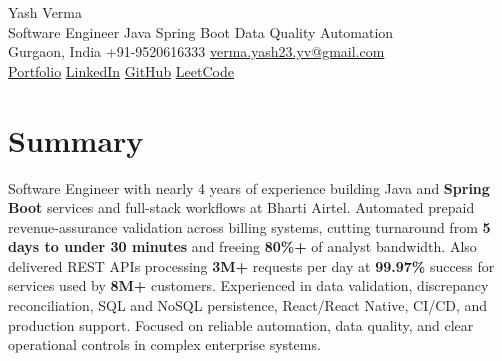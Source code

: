 \documentclass[letterpaper,11pt]{article}
\begin{document}
\begin{center}
  {\Huge Yash Verma} \\
  \small Software Engineer \textperiodcentered{} Java \textperiodcentered{} Spring Boot \textperiodcentered{} Data Quality \textperiodcentered{} Automation \\
  \vspace{5pt}
  \small Gurgaon, India \textbar{} +91-9520616333 \textbar{}
  \href{mailto:verma.yash23.yv@gmail.com}{verma.yash23.yv@gmail.com} \\
  \vspace{7pt}
  \href{https://yashverma230600.github.io/yash-portfolio/}{Portfolio} \textbar{}
  \href{https://www.linkedin.com/in/yash-verma-9243a7193/}{LinkedIn} \textbar{}
  \href{https://github.com/yashverma230600}{GitHub} \textbar{}
  \href{https://leetcode.com/yashverma230600}{LeetCode}
  \vspace{-8pt}
\end{center}

\section{Summary}
\begin{itemize}[leftmargin=0.15in, label={}]
  \small{\item{
    Software Engineer with nearly 4 years of experience building Java and \textbf{Spring Boot} services and full-stack workflows at Bharti Airtel. Automated prepaid revenue-assurance validation across billing systems, cutting turnaround from \textbf{5 days to under 30 minutes} and freeing \textbf{80\%+} of analyst bandwidth. Also delivered REST APIs processing \textbf{3M+} requests per day at \textbf{99.97\%} success for services used by \textbf{8M+} customers. Experienced in data validation, discrepancy reconciliation, SQL and NoSQL persistence, React/React Native, CI/CD, and production support. Focused on reliable automation, data quality, and clear operational controls in complex enterprise systems.
  }}
\end{itemize}
\vspace{-8pt}

\end{document}

